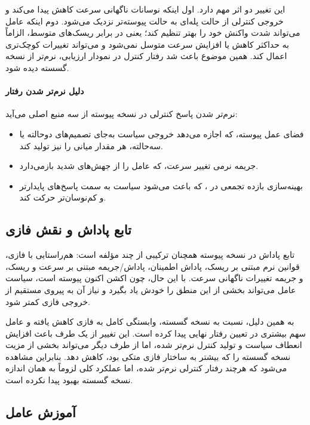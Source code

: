 \documentclass[a4paper, 10pt, twocolumn]{article}
\begin{document}
	این تغییر دو اثر مهم دارد. اول اینکه نوسانات ناگهانی سرعت کاهش پیدا
	می‌کند و خروجی کنترلی از حالت پله‌ای به حالت پیوسته‌تر نزدیک می‌شود.
	دوم اینکه عامل می‌تواند شدت واکنش خود را بهتر تنظیم کند؛ یعنی در برابر
	ریسک‌های متوسط، الزاماً به حداکثر کاهش یا افزایش سرعت متوسل نمی‌شود و
	می‌تواند تغییرات کوچک‌تری اعمال کند. همین موضوع باعث شد رفتار کنترل در
	نمودار ارزیابی، نرم‌تر از نسخه گسسته دیده شود.
	
	\paragraph{دلیل نرم‌تر شدن رفتار}
	
	نرم‌تر شدن پاسخ کنترلی در نسخه پیوسته از سه منبع اصلی می‌آید:
	\begin{itemize}
		\item فضای عمل پیوسته، که اجازه می‌دهد خروجی سیاست به‌جای تصمیم‌های
		دوحالته یا سه‌حالته، هر مقدار میانی را نیز تولید کند.
		\item جریمه نرمی تغییر سرعت، که عامل را از جهش‌های شدید بازمی‌دارد.
		\item بهینه‌سازی بازده تجمعی در ، که باعث می‌شود سیاست به
		سمت پاسخ‌های پایدارتر و کم‌نوسان‌تر حرکت کند.
	\end{itemize}
	
	\subsection{تابع پاداش و نقش فازی}
	
	تابع پاداش در نسخه پیوسته همچنان ترکیبی از چند مؤلفه است: هم‌راستایی با
	فازی، قوانین نرم مبتنی بر ریسک، پاداش اطمینان، پاداش/جریمه مبتنی بر
	سرعت و ریسک، و جریمه تغییرات ناگهانی سرعت. با این حال، چون اکشن اکنون
	پیوسته است، سیاست عامل می‌تواند بخشی از این منطق را خودش یاد بگیرد و
	نیاز آن به پیروی مستقیم از خروجی فازی کمتر شود.
	
	به همین دلیل، نسبت به نسخه گسسته، وابستگی کامل به فازی کاهش یافته و
	عامل سهم بیشتری در تعیین رفتار نهایی پیدا کرده است. این تغییر از یک طرف
	باعث افزایش انعطاف سیاست و تولید کنترل نرم‌تر شده، اما از طرف دیگر
	می‌تواند بخشی از مزیت نسخه گسسته را که بیشتر به ساختار فازی متکی بود،
	کاهش دهد. بنابراین مشاهده می‌شود که هرچند رفتار کنترلی نرم‌تر شده، اما
	عملکرد کلی لزوماً به همان اندازه نسخه گسسته بهبود پیدا نکرده است.
	
	\subsection{آموزش عامل }
	
\end{document}
